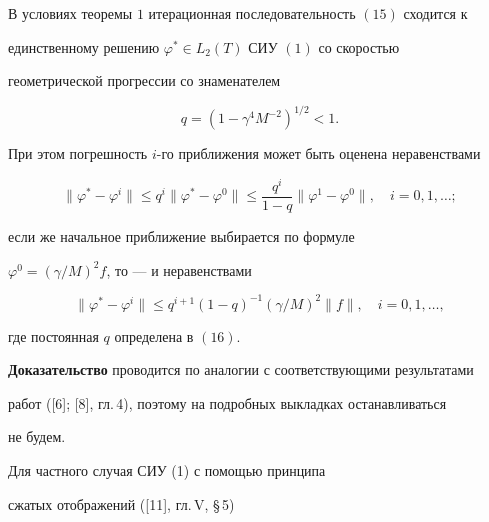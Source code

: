 \begin{thm}


В условиях теоремы $1$ итерационная последовательность $(15)$ сходится к


единственному решению $\varphi ^\ast \in L_2(T)$ СИУ $(1)$ со скоростью


геометрической прогрессии со знаменателем


\begin{equation}


q=(1-\gamma ^4M^{-2})^{1/2}<1.


\end{equation}


При этом погрешность $i$-го приближения может быть оценена неравенствами


\begin{equation}


\|\varphi ^\ast -\varphi ^i\|\leq q^i 


\|\varphi ^\ast -\varphi ^0\|\leq \frac{q^i}{1-q} 


\|\varphi ^1-\varphi ^0\|,\quad i=0,1,\dotsc;


\end{equation}


если же начальное приближение выбирается по формуле


$\varphi ^0=(\gamma /M)^2f $, то --- и неравенствами


\begin{equation}


\|\varphi ^\ast -\varphi ^i\|\leq q^{i+1}(1-q)^{-1}


( \gamma /M)^2\|f\|,\quad i=0,1,\ldots,


\end{equation}


где постоянная $q$ определена в $(16)$.


\end{thm}








{\bf Доказательство } проводится по аналогии с соответствующими результатами 


работ ([6]; [8], гл.\,4), поэтому на подробных выкладках останавливаться 


не будем.





Для частного случая СИУ (1) с помощью принципа


сжатых отображений ([11], гл.\,V, \S\,5)


